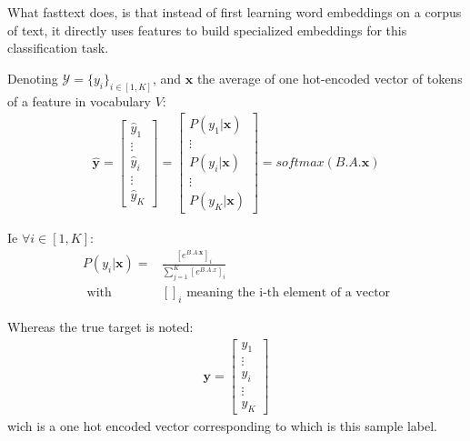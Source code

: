 What fasttext does, is that instead of first learning word embeddings on a corpus of text, it directly uses features to build specialized embeddings for this classification task.

Denoting $\mathcal{Y} = \{y_i\}_{i \in [1, K]}$, and $\mathbf{x}$ the average of one hot-encoded vector of tokens of a feature in vocabulary $V$:
\begin{align}
 \mathbf{\hat y} 
 = 
	\begin{bmatrix} 
		\hat y_1 \\
		\vdots \\
		\hat y_i\\
		\vdots \\
		\hat y_K
	\end{bmatrix} 
 =	\begin{bmatrix} 
		P(y_1 | \mathbf{x}) \\
		\vdots \\
		P(y_i | \mathbf{x})\\
		\vdots \\
		P(y_K | \mathbf{x})
	\end{bmatrix} = 
	softmax(B.A.\mathbf{x})
\end{align}

Ie $\forall i \in [1, K]$:
\begin{align}
 P(y_i | \mathbf{x})= 
 	&\frac{  [e^{B.A.\mathbf{x}}]_i}
 	{\sum_{j=1}^{K} [e^{B.A.x}]_i} \\
 	\text{      with}& []_i \text{ meaning the i-th element of a vector}
\end{align}


Whereas the true target is noted:
\begin{align}
 \mathbf{y} = 
	\begin{bmatrix} 
		y_1 \\
		\vdots \\
		y_i \\
		\vdots \\
		y_K
	\end{bmatrix} 
\end{align}
wich is a one hot encoded vector corresponding to which is this sample label.


